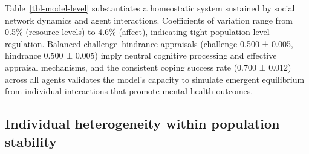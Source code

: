 \documentclass[
  letterpaper,
  DIV=11,
  numbers=noendperiod]{scrartcl}
\begin{document}
\begin{table}

\caption{\label{tbl-model-level}Model-level population statistics
demonstrating homeostatic stability}


\end{table}%

Table~\ref{tbl-model-level} substantiates a homeostatic system sustained
by social network dynamics and agent interactions. Coefficients of
variation range from 0.5\% (resource levels) to 4.6\% (affect),
indicating tight population-level regulation. Balanced
challenge--hindrance appraisals (challenge 0.500 ± 0.005, hindrance
0.500 ± 0.005) imply neutral cognitive processing and effective
appraisal mechanisms, and the consistent coping success rate (0.700 ±
0.012) across all agents validates the model's capacity to simulate
emergent equilibrium from individual interactions that promote mental
health outcomes.

\subsection{Individual heterogeneity within population
stability}\label{individual-heterogeneity-within-population-stability}
\end{document}
